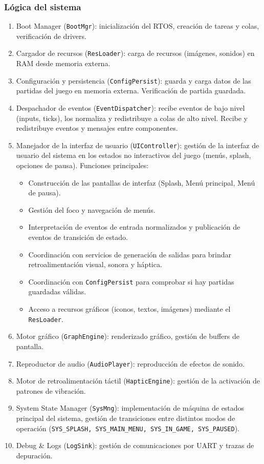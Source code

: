 \documentclass[11pt,a4paper]{article}
\begin{document}
\subsubsection{Lógica del sistema}
\begin{enumerate}
    \item Boot Manager (\texttt{BootMgr}): inicialización del RTOS, creación de tareas y colas, verificación de drivers.
    \item Cargador de recursos (\texttt{ResLoader}): carga de recursos (imágenes, sonidos) en RAM desde memoria externa.
    \item Configuración y persistencia (\texttt{ConfigPersist}): guarda y carga datos de las partidas del juego en memoria externa. Verificación de partida guardada.
    \item Despachador de eventos (\texttt{EventDispatcher}): recibe eventos de bajo nivel (inputs, ticks), los normaliza y redistribuye a colas de alto nivel. Recibe y redistribuye eventos y mensajes entre componentes. 
    \item Manejador de la interfaz de usuario (\texttt{UIController}): gestión de la interfaz de usuario del sistema en los estados no interactivos del juego (menús, splash, opciones de pausa). Funciones principales:
    \begin{itemize}
      \item Construcción de las pantallas de interfaz (Splash, Menú principal, Menú de pausa).
      \item Gestión del foco y navegación de menús.
      \item Interpretación de eventos de entrada normalizados y publicación de eventos de transición de estado.
      \item Coordinación con servicios de generación de salidas para brindar retroalimentación visual, sonora y háptica.
      \item Coordinación con \texttt{ConfigPersist} para comprobar si hay partidas guardadas válidas.
      \item Acceso a recursos gráficos (iconos, textos, imágenes) mediante el \texttt{ResLoader}.
    \end{itemize}
    \item Motor gráfico (\texttt{GraphEngine}): renderizado gráfico, gestión de buffers de pantalla.
    \item Reproductor de audio (\texttt{AudioPlayer}): reproducción de efectos de sonido.
    \item Motor de retroalimentación táctil (\texttt{HapticEngine}): gestión de la activación de patrones de vibración.
    \item System State Manager (\texttt{SysMng}): implementación de máquina de estados principal del sistema, gestión de transiciones entre distintos modos de operación (\texttt{SYS\_SPLASH, SYS\_MAIN\_MENU, SYS\_IN\_GAME, SYS\_PAUSED}).
    \item Debug \& Logs (\texttt{LogSink}): gestión de comunicaciones por UART y trazas de depuración.
\end{enumerate}
\end{document}
